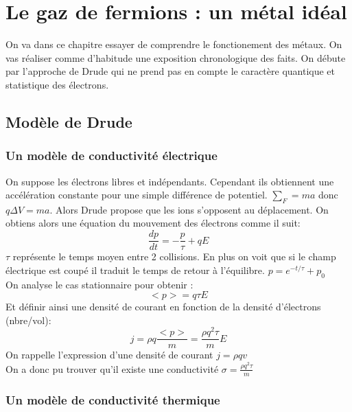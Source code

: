 \chapter{Le gaz de fermions : un métal idéal}




On va dans ce chapitre essayer de comprendre le fonctionement des métaux. On vas réaliser comme d'habitude une exposition chronologique des faits. On débute par l'approche de Drude qui ne prend pas en compte le caractère quantique et statistique des électrons.


\section{Modèle de Drude}


\subsection{Un modèle de conductivité électrique}

On suppose les électrons libres et indépendants. Cependant ils obtiennent une accélération constante pour une simple différence de potentiel. $\sum_F=ma$ donc $q\Delta V=ma$. Alors Drude propose 
que les ions s'opposent au déplacement. On obtiens alors une équation du mouvement des électrons comme il suit:
$$\frac{dp}{dt}=-\frac{p}{\tau}+qE$$
$\tau$ représente le temps moyen entre 2 collisions. En plus on voit que si le champ électrique est coupé il traduit le temps de retour à l'équilibre. $p=e^{-t/\tau}+p_0$\\
On analyse le cas stationnaire pour obtenir :
$$<p>=q\tau E$$
Et définir ainsi une densité de courant en fonction de la densité d'électrons (nbre/vol):
$$j=\rho q \frac{<p>}{m}=\frac{\rho q^2 \tau}{m}E$$ 
On rappelle l'expression d'une densité de courant $j=\rho q v$\\
On a donc pu trouver qu'il existe une conductivité $\sigma =\frac{\rho q^2 \tau}{m}$

\subsection{Un modèle de conductivité thermique}

